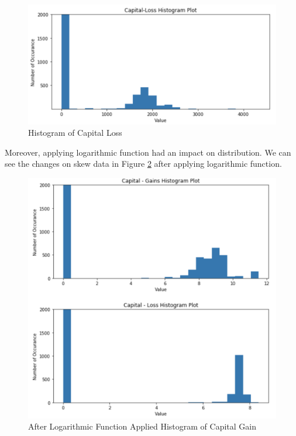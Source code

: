 \documentclass[sigconf]{acmart}
\begin{document}
 \begin{figure}[!ht]
  \centering
      \includegraphics[width=\columnwidth]{images/capital-loss.png}
  \caption{Histogram of Capital Loss \cite{Borga2017}}\label{fig:loss-capital}
\end{figure}

\par Moreover, applying logarithmic function had an impact on distribution. We can see the changes on skew data in Figure \ref{fig:Hist-capital-log} after applying logarithmic function. 

 \begin{figure}[!ht]
  \centering
      \includegraphics[width=\columnwidth]{images/logarithmic-applied.png}
  \caption{After Logarithmic Function Applied Histogram of Capital Gain \cite{Borga2017}}\label{fig:Hist-capital-log}
\end{figure}
\end{document}
